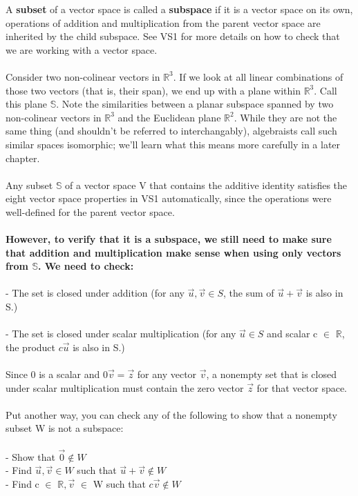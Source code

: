 \documentclass{article}
\begin{document}
{A \textbf{subset} of a vector space is called a \textbf{subspace} if it is a vector space on its own, operations of addition and multiplication from the parent vector space are inherited by the child subspace. See VS1 for more details on how to check that we are working with a vector space.\\
\\
Consider two non-colinear vectors in $\mathbb{R}^{3}$. If we look at all linear combinations of those two vectors (that is, their span), we end up with a plane within  $\mathbb{R}^{3}$. Call this plane $\mathbb{S}$. Note the similarities between a planar subspace spanned by two non-colinear vectors in  $\mathbb{R}^{3}$ and the Euclidean plane $\mathbb{R}^{2}$. While they are not the same thing (and shouldn't be referred to interchangably), algebraists call such similar spaces isomorphic; we'll learn what this means more carefully in a later chapter.\\
\\
Any subset $\mathbb{S}$ of a vector space V that contains the additive identity
satisfies the eight vector space properties in VS1 automatically, since the operations were well-defined for the parent vector space.\\
\\
\textbf{However, to verify that it is a subspace, we still need to make sure that addition and multiplication make sense when using only vectors from $\mathbb{S}$. We need to check:}\\
\\
- The set is closed under addition (for any $\vec{u},\vec{v} \in {S}$, the sum of $\vec{u} + \vec{v}$ is also in S.)\\
\\
- The set is closed under scalar multiplication (for any $\vec{u} \in {S}$ and scalar c $\in$ $\mathbb{R}$, the product $c\vec{u}$ is also in S.)\\
\\
Since 0 is a scalar and $0\vec{v}=\vec{z}$ for any vector $\vec{v}$, a nonempty set that is closed under scalar multiplication must contain the zero vector $\vec{z}$ for that vector space.\\
\\
Put another way, you can check any of the following to show that a nonempty subset W is not a subspace:\\
\\
- Show that $\vec{0} \notin W$\\
- Find $\vec{u}, \vec{v} \in W$ such that $\vec{u} + \vec{v} \notin W$\\
- Find c $\in$ $\mathbb{R},\vec{v}$ $\in$ W such that $c\vec{v} \notin W$
\\
}
\end{document}
